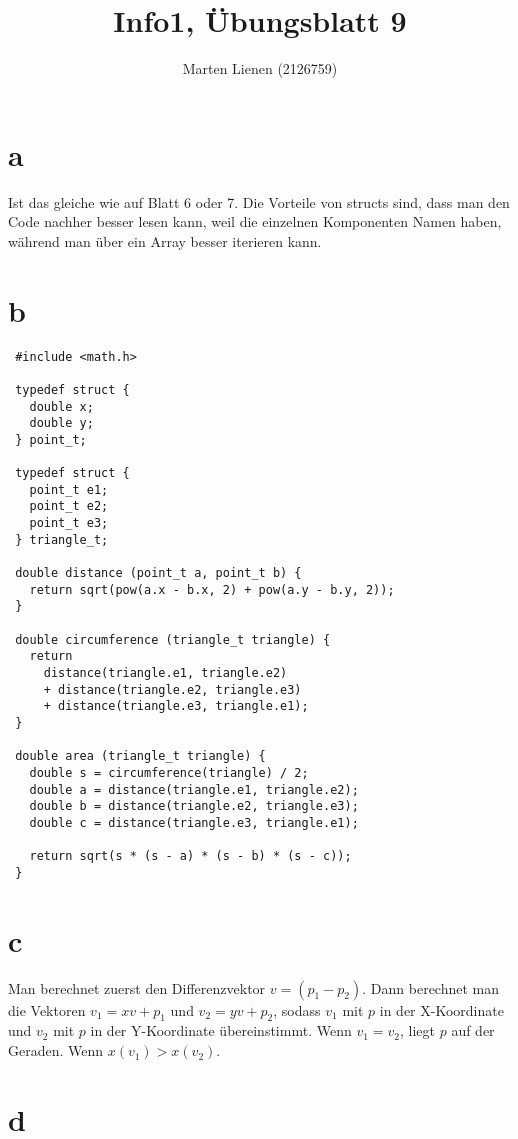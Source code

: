 \documentclass[a4paper,10pt]{article}
\title{Info1, Übungsblatt 9}
\author{Marten Lienen (2126759)}
\begin{document}
\maketitle

\section*{a}

Ist das gleiche wie auf Blatt 6 oder 7.
Die Vorteile von structs sind, dass man den Code nachher besser lesen kann, weil die einzelnen Komponenten Namen haben, während man über ein Array besser iterieren kann.

\section*{b}

\lstset{language=c}
\begin{lstlisting}
 #include <math.h>

 typedef struct {
   double x;
   double y;
 } point_t;

 typedef struct {
   point_t e1;
   point_t e2;
   point_t e3;
 } triangle_t;

 double distance (point_t a, point_t b) {
   return sqrt(pow(a.x - b.x, 2) + pow(a.y - b.y, 2));
 }

 double circumference (triangle_t triangle) {
   return
     distance(triangle.e1, triangle.e2)
     + distance(triangle.e2, triangle.e3)
     + distance(triangle.e3, triangle.e1);
 }

 double area (triangle_t triangle) {
   double s = circumference(triangle) / 2;
   double a = distance(triangle.e1, triangle.e2);
   double b = distance(triangle.e2, triangle.e3);
   double c = distance(triangle.e3, triangle.e1);
  
   return sqrt(s * (s - a) * (s - b) * (s - c));
 }
\end{lstlisting}

\section*{c}

Man berechnet zuerst den Differenzvektor $v = (p_1 - p_2)$.
Dann berechnet man die Vektoren $v_1 = xv + p_1$ und $v_2 = yv + p_2$, sodass $v_1$ mit $p$ in der X-Koordinate und $v_2$ mit $p$ in der Y-Koordinate übereinstimmt.
Wenn $v_1 = v_2$, liegt $p$ auf der Geraden.
Wenn $x(v_1) > x(v_2)$.

\section*{d}
\end{document}
